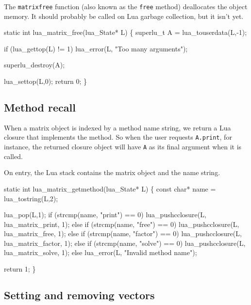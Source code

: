 The {\tt{}matrix{}free} function (also known as the {\tt{}free} method)
deallocates the object memory.  It should probably be called on
Lua garbage collection, but it isn't yet. %

\nwenddocs{}\plusendmoddef
static int lua_matrix_free(lua_State* L)
\{
    superlu_t A = lua_touserdata(L,-1);

    if (lua_gettop(L) != 1)
        lua_error(L, "Too many arguments");

    superlu_destroy(A);

    lua_settop(L,0);
    return 0;
\}

\nwendcode{}\nwdocspar


\subsection{Method recall}

When a matrix object is indexed by a method name string,
we return a Lua closure that implements the method.
So when the user requests {\tt{}A.print}, for instance,
the returned closure object will have {\tt{}A} as its final
argument when it is called.

On entry, the Lua stack contains the matrix object
and the name string.

\nwenddocs{}\plusendmoddef
static int lua_matrix_getmethod(lua_State* L)
\{
    const char* name = lua_tostring(L,2);

    lua_pop(L,1);
    if (strcmp(name, "print") == 0)
        lua_pushcclosure(L, lua_matrix_print, 1);
    else if (strcmp(name, "free") == 0)
        lua_pushcclosure(L, lua_matrix_free, 1);
    else if (strcmp(name, "factor") == 0)
        lua_pushcclosure(L, lua_matrix_factor, 1);
    else if (strcmp(name, "solve") == 0)
        lua_pushcclosure(L, lua_matrix_solve, 1);
    else
        lua_error(L, "Invalid method name");

    return 1;
\}

\nwendcode{}\nwdocspar


\subsection{Setting and removing vectors}

